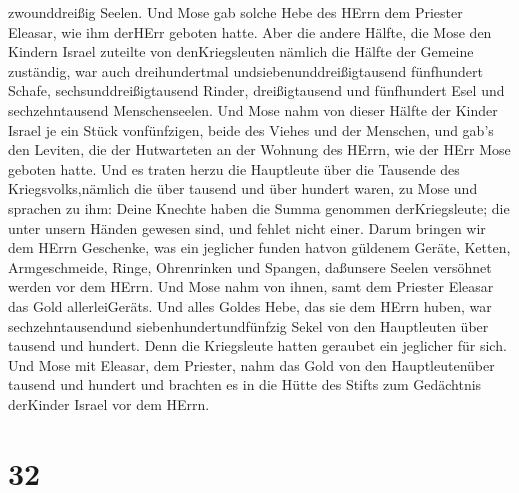 zwounddreißig Seelen.  Und Mose gab solche Hebe des HErrn
dem Priester Eleasar, wie ihm derHErr geboten hatte.  Aber
die andere Hälfte, die Mose den Kindern Israel zuteilte von
denKriegsleuten  nämlich die Hälfte der Gemeine zuständig,
war auch dreihundertmal undsiebenunddreißigtausend fünfhundert Schafe,
 sechsunddreißigtausend Rinder, 
dreißigtausend und fünfhundert Esel  und sechzehntausend
Menschenseelen.  Und Mose nahm von dieser Hälfte der Kinder
Israel je ein Stück vonfünfzigen, beide des Viehes und der Menschen, und
gab's den Leviten, die der Hutwarteten an der Wohnung des HErrn, wie der
HErr Mose geboten hatte.  Und es traten herzu die
Hauptleute über die Tausende des Kriegsvolks,nämlich die über tausend
und über hundert waren, zu Mose  und sprachen zu ihm: Deine
Knechte haben die Summa genommen derKriegsleute; die unter unsern Händen
gewesen sind, und fehlet nicht einer.  Darum bringen wir
dem HErrn Geschenke, was ein jeglicher funden hatvon güldenem Geräte,
Ketten, Armgeschmeide, Ringe, Ohrenrinken und Spangen, daßunsere Seelen
versöhnet werden vor dem HErrn.  Und Mose nahm von ihnen,
samt dem Priester Eleasar das Gold allerleiGeräts.  Und
alles Goldes Hebe, das sie dem HErrn huben, war sechzehntausendund
siebenhundertundfünfzig Sekel von den Hauptleuten über tausend und
hundert.  Denn die Kriegsleute hatten geraubet ein
jeglicher für sich.  Und Mose mit Eleasar, dem Priester,
nahm das Gold von den Hauptleutenüber tausend und hundert und brachten
es in die Hütte des Stifts zum Gedächtnis derKinder Israel vor dem
HErrn.

\hypertarget{section-31}{%
\section{32}\label{section-31}}

